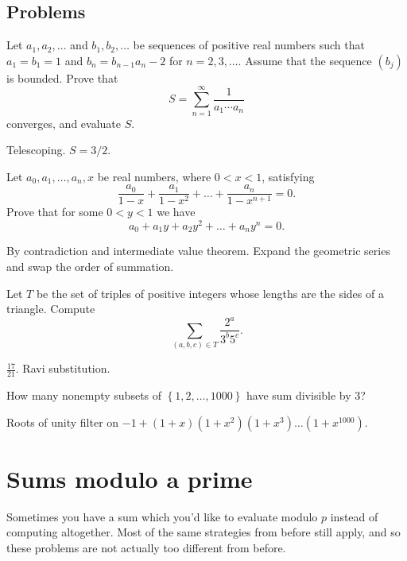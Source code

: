 \documentclass[11pt]{scrartcl}
\begin{document}
\subsection{Problems}

\begin{problem}
  [Putnam 2011]
  Let $a_1,a_2,\dots$ and $b_1,b_2,\dots$ be sequences of positive
  real numbers such that $a_1 = b_1 = 1$ and $b_n = b_{n-1} a_n - 2$ for
  $n=2,3,\dots$. Assume that the sequence $(b_j)$ is bounded. Prove that
  \[
  S = \sum_{n=1}^\infty \frac{1}{a_1 \cdots a_n}
  \]
  converges, and evaluate $S$.
  \begin{hint}
    Telescoping. $S = 3/2$.
  \end{hint}
\end{problem}
\begin{problem}
  [Putnam 2013]
  Let $a_0, a_1, \dots, a_n, x$ be real numbers, where $0 < x < 1$, satisfying
  \[ \frac{a_0}{1-x} + \frac{a_1}{1-x^2} + \dots + \frac{a_n}{1-x^{n+1}} = 0. \]
  Prove that for some $0 < y < 1$ we have
  \[ a_0 + a_1y + a_2y^2 + \dots + a_n y^n = 0. \]
  \begin{hint}
    By contradiction and intermediate value theorem.
    Expand the geometric series and swap the order of summation.
  \end{hint}
\end{problem}
\begin{problem} %
  [Putnam 2015]
  Let $T$ be the set of triples of positive integers
  whose lengths are the sides of a triangle.
  Compute \[ \sum_{(a,b,c) \in T} \frac{2^a}{3^b5^c}. \]
  \begin{hint}
    $\frac{17}{21}$. Ravi substitution.
  \end{hint}
\end{problem}

\begin{problem} %
  How many nonempty subsets of $\left\{ 1,2,\dots,1000 \right\}$
  have sum divisible by $3$?
  \begin{hint}
    Roots of unity filter on
    $-1+(1+x)(1+x^2)(1+x^3)\dots(1+x^{1000})$.
  \end{hint}
\end{problem}

\section{Sums modulo a prime}
Sometimes you have a sum which you'd like to evaluate modulo $p$ instead
of computing altogether. Most of the same strategies from before still apply,
and so these problems are not actually too different from before.
\end{document}
